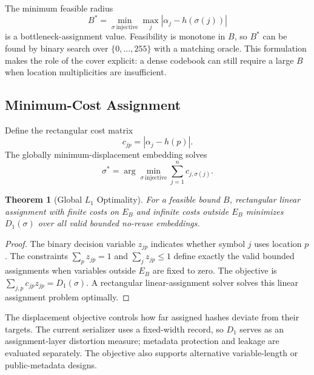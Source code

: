\documentclass[preprint,12pt]{elsarticle}
\theoremstyle{plain}
\newtheorem{theorem}{Theorem}
\begin{document}
The minimum feasible radius
\begin{equation}
    B^*=\min_{\sigma\ \mathrm{injective}}\max_j
    |\alpha_j-h(\sigma(j))|
\end{equation}
is a bottleneck-assignment value. Feasibility is monotone in $B$, so $B^*$ can
be found by binary search over $\{0,\ldots,255\}$ with a matching oracle. This
formulation makes the role of the cover explicit: a dense codebook can still
require a large $B$ when location multiplicities are insufficient.

\subsection{Minimum-Cost Assignment}

Define the rectangular cost matrix
\begin{equation}
    c_{jp}=|\alpha_j-h(p)|.
\end{equation}
The globally minimum-displacement embedding solves
\begin{equation}
    \sigma^*=\arg\min_{\sigma\ \mathrm{injective}}
    \sum_{j=1}^{n}c_{j,\sigma(j)}.
\end{equation}

\begin{theorem}[Global $L_1$ Optimality]
\label{thm:assignment_optimality}
For a feasible bound $B$, rectangular linear assignment with finite costs on
$E_B$ and infinite costs outside $E_B$ minimizes $D_1(\sigma)$ over all valid
bounded no-reuse embeddings.
\end{theorem}
\begin{proof}
The binary decision variable $z_{jp}$ indicates whether symbol $j$ uses
location $p$. The constraints
$\sum_p z_{jp}=1$ and $\sum_j z_{jp}\leq1$ define exactly the valid bounded
assignments when variables outside $E_B$ are fixed to zero. The objective is
$\sum_{j,p}c_{jp}z_{jp}=D_1(\sigma)$. A rectangular linear-assignment solver solves this
linear assignment problem optimally.
\end{proof}

The displacement objective controls how far assigned hashes deviate from their
targets. The current serializer uses a fixed-width record, so $D_1$ serves as
an assignment-layer distortion measure; metadata protection and leakage are
evaluated separately. The objective also supports alternative variable-length
or public-metadata designs.
\end{document}
